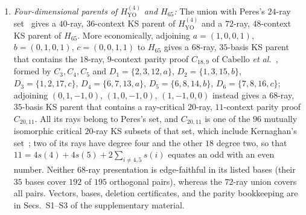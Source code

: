 \documentclass[aps,pra,reprint,superscriptaddress,longbibliography,nofootinbib,floatfix,10pt]{revtex4-2}
\theoremstyle{definition}\newtheorem{definition}[theorem]{Definition}
\theoremstyle{remark}\newtheorem{remark}[theorem]{Remark}
\newcommand{\YO}{\mathrm{YO}}\newcommand{\ip}[2]{\langle #1,#2\rangle}
\begin{document}
\begin{enumerate}
\item \emph{Four-dimensional parents of $H_{\YO}^{(4)}$ and $H_{65}$:} The union with Peres's $24$-ray set~\cite{peres-91} gives a $40$-ray, $36$-context KS parent of $H_{\YO}^{(4)}$ and a $72$-ray, $48$-context KS parent of $H_{65}$. More economically, adjoining $a=(1,0,0,1)$, $b=(0,1,0,1)$, $c=(0,0,1,1)$ to $H_{65}$ gives a $68$-ray, $35$-basis KS parent that contains the $18$-ray, $9$-context parity proof $C_{18,9}$ of Cabello \emph{et al.}~\cite{cabello-96}, formed by $C_3,C_4,C_5$ and $D_1=\{2,3,12,a\}$, $D_2=\{1,3,15,b\}$, $D_3=\{1,2,17,c\}$, $D_4=\{6,7,13,a\}$, $D_5=\{6,8,14,b\}$, $D_6=\{7,8,16,c\}$; adjoining $(0,1,-1,0)$, $(1,0,-1,0)$, $(1,-1,0,0)$ instead gives a $68$-ray, $35$-basis KS parent that contains a ray-critical $20$-ray, $11$-context parity proof $C_{20,11}$. All its rays belong to Peres's set, and $C_{20,11}$ is one of the $96$ mutually isomorphic critical $20$-ray KS subsets of that set, which include Kernaghan's set~\cite{Kernaghan-1994,cabello-96}; two of its rays have degree four and the other $18$ degree two, so that $11=4s(4)+4s(5)+2\sum_{i\ne4,5}s(i)$ equates an odd with an even number. Neither $68$-ray presentation is edge-faithful in its listed bases (their $35$ bases cover $192$ of $195$ orthogonal pairs), whereas the $72$-ray union covers all pairs. Vectors, bases, deletion certificates, and the parity bookkeeping are in Secs.~S1--S3 of the supplementary material.


\end{enumerate}
\end{document}
